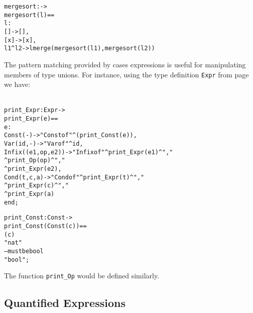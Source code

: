 \documentclass[\pformat,12pt]{article}
\begin{document}
\begin{description}
\begin{alltt}
  mergesort :  -> 
  mergesort (l) ==
     l:
      [] -> [],
      [x] -> [x],
      l1\verb+^+l2 -> lmerge (mergesort(l1), mergesort(l2))
  \end{alltt}
The pattern matching provided by cases expressions is useful for
  manipulating members of type unions. For instance, using the type
  definition \texttt{Expr} from page \pageref{exprdef} we have:
  \begin{alltt}\label{printExprDef}
  print_Expr : Expr -> 
  print_Expr (e) ==
     e:
      Const(-) -> "Const of"\verb+^+(print_Const(e)),
      Var(id,-) -> "Var of"\verb+^+id,
      Infix((e1,op,e2)) -> "Infix of"\verb+^+print_Expr(e1)^","
                                      \verb+^+print_Op(op)\verb+^+","
                                      \verb+^+print_Expr(e2),
      Cond(t,c,a) -> "Cond of"\verb+^+print_Expr(t)\verb+^+","
                                 \verb+^+print_Expr(c)\verb+^+","
                                 \verb+^+print_Expr(a)
    end;

  print_Const : Const -> 
  print_Const(Const(c)) ==
     (c)
     "nat"
     -- must be bool
         "bool";
  \end{alltt}
  The function \texttt{print\_Op} would be defined similarly.
\end{description}

\subsection{Quantified Expressions}
\end{document}
